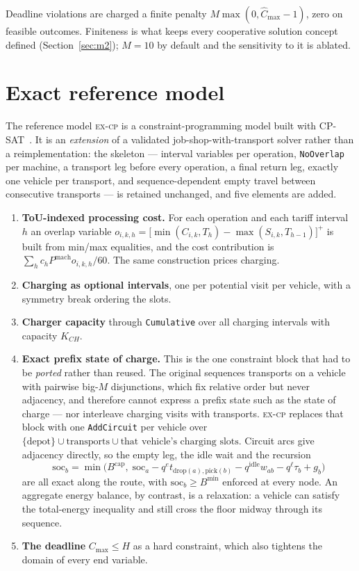 \documentclass[preprint, 3p, review, 12pt]{elsarticle}
\theoremstyle{definition}
\begin{document}
Deadline violations are charged a finite penalty $M\max(0,\widehat{C}_{\max}-1)$, zero on
feasible outcomes. Finiteness is what keeps every cooperative solution concept defined
(Section~\ref{sec:m2}); $M=10$ by default and the sensitivity to it is ablated.

\section{Exact reference model}
\label{sec:exact}

The reference model \textsc{ex-cp} is a constraint-programming model built with
CP-SAT~\citep{ortools}. It is an \emph{extension} of a validated job-shop-with-transport
solver rather than a reimplementation: the skeleton --- interval variables per operation,
\texttt{NoOverlap} per machine, a transport leg before every operation, a final return leg,
exactly one vehicle per transport, and sequence-dependent empty travel between consecutive
transports --- is retained unchanged, and five elements are added.

\begin{enumerate}
\item \textbf{ToU-indexed processing cost.} For each operation and each tariff interval $h$
an overlap variable $o_{i,k,h}=\big[\min(C_{i,k},T_h)-\max(S_{i,k},T_{h-1})\big]^{+}$ is
built from min/max equalities, and the cost contribution is
$\sum_h c_h P^{\mathrm{mach}} o_{i,k,h}/60$. The same construction prices charging.
\item \textbf{Charging as optional intervals}, one per potential visit per vehicle, with a
symmetry break ordering the slots.
\item \textbf{Charger capacity} through \texttt{Cumulative} over all charging intervals with
capacity $K_{CH}$.
\item \textbf{Exact prefix state of charge.} This is the one constraint block that had to be
\emph{ported} rather than reused. The original sequences transports on a vehicle with
pairwise big-$M$ disjunctions, which fix relative order but never adjacency, and therefore
cannot express a prefix state such as the state of charge --- nor interleave charging visits
with transports. \textsc{ex-cp} replaces that block with one \texttt{AddCircuit} per vehicle
over $\{\text{depot}\}\cup\text{transports}\cup\text{that vehicle's charging slots}$. Circuit
arcs give adjacency directly, so the empty leg, the idle wait and the recursion
\begin{equation}
\mathrm{soc}_b = \min\!\big(B^{\mathrm{cap}},\;
\mathrm{soc}_a - q^{e}t_{\mathrm{drop}(a),\mathrm{pick}(b)} - q^{\mathrm{idle}}w_{ab}
- q^{\ell}\tau_b + g_b\big)
\label{eq:socrec}
\end{equation}
are all exact along the route, with $\mathrm{soc}_b \ge B^{\min}$ enforced at every node.
An aggregate energy balance, by contrast, is a relaxation: a vehicle can satisfy the
total-energy inequality and still cross the floor midway through its sequence.
\item \textbf{The deadline} $C_{\max}\le H$ as a hard constraint, which also tightens the
domain of every end variable.
\end{enumerate}
\end{document}
